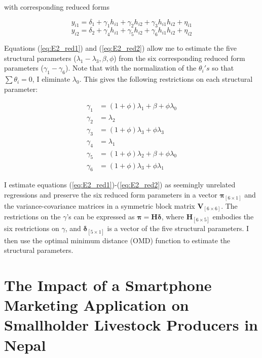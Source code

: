\documentclass[11pt]{article}
\begin{document}
with corresponding reduced forms

\begin{equation} \label{eq:E2_red1}
    y_{i1} = \delta_1 + \gamma_{1}h_{i1} + \gamma_{2}h_{i2} + \gamma_{3}h_{i1}h_{i2} + \eta_{i1}
\end{equation}
\begin{equation} \label{eq:E2_red2}
    y_{i2} = \delta_2 + \gamma_{4}h_{i1} + \gamma_{5}h_{i2} + \gamma_{6}h_{i1}h_{i2} + \eta_{i2}
\end{equation}

Equations (\ref{eq:E2_red1}) and (\ref{eq:E2_red2}) allow me to estimate the five structural parameters ($\lambda_1-\lambda_3,\beta,\phi$) from the six corresponding reduced form parameters ($\gamma_{1}-\gamma_{6}$). Note that with the normalization of the $\theta_{i}'s$ so that $\sum \theta_{i} = 0$, I eliminate $\lambda_0$. This gives the following restrictions on each structural parameter:

\begin{align*}
    \gamma_1 & = (1+\phi)\lambda_1 + \beta + \phi\lambda_0 \\
    \gamma_2 & = \lambda_2 \\
    \gamma_3 & = (1+\phi)\lambda_3 + \phi\lambda_3 \\
    \gamma_4 & = \lambda_1 \\
    \gamma_5 & = (1+\phi)\lambda_2 + \beta + \phi\lambda_0 \\
    \gamma_6 & = (1+\phi)\lambda_3 + \phi\lambda_1
\end{align*}

I estimate equations (\ref{eq:E2_red1})-(\ref{eq:E2_red2}) as seemingly unrelated regressions and preserve the six reduced form parameters in a vector $\boldsymbol{\pi}_{[6 \times 1]}$ and the variance-covariance matrices in a symmetric block matrix $\textbf{V}_{[6 \times 6]}$. The restrictions on the $\gamma$’s can be expressed as $\boldsymbol{\pi} = \textbf{H}\boldsymbol{\delta}$, where $\textbf{H}_{[6 \times 5]}$ embodies the six restrictions on $\gamma$, and $\boldsymbol{\delta}_{[5 \times 1]}$ is a vector of the five structural parameters. I then use the optimal minimum distance (OMD) function to estimate the structural parameters.%


\newpage
\singlespacing

\section{The Impact of a Smartphone Marketing Application on Smallholder Livestock Producers in Nepal} \label{sec:E3}
\doublespacing
\end{document}
